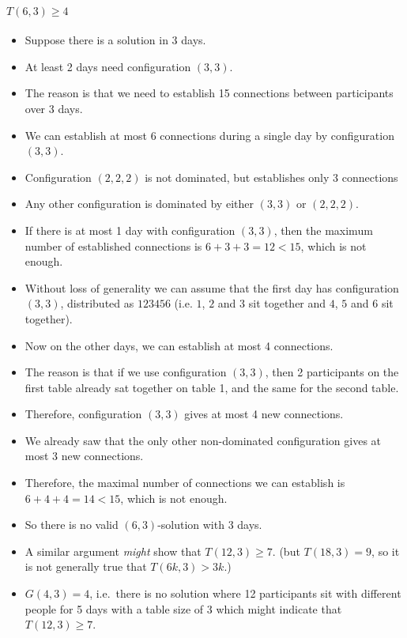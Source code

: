 \documentclass[a4paper]{article}
\begin{document}
\paragraph{$T(6,3) \geq  4$}

\begin{itemize}

\item
  Suppose there is a solution in 3 days.
\item
  At least 2 days need configuration $(3,3)$.
\item
  The reason is that we need to establish 15 connections between
  participants over 3 days.
\item
  We can establish at most 6 connections during a single day by
  configuration $(3,3)$.
\item
  Configuration $(2,2,2)$ is not dominated, but establishes only
  3 connections
\item
  Any other configuration is dominated by either $(3,3)$ or
  $(2,2,2)$.
\item
  If there is at most 1 day with configuration $(3,3)$, then the
  maximum number of established connections is
  $6+3+3=12<15$, which is not enough.
\item
  Without loss of generality we can assume that the first day has
  configuration $(3,3)$, distributed as $123456$ (i.e.
  $1$, $2$ and $3$ sit together and $4$,
  $5$ and $6$ sit together).
\item
  Now on the other days, we can establish at most 4 connections.
\item
  The reason is that if we use configuration $(3,3)$, then 2
  participants on the first table already sat together on table 1, and
  the same for the second table.
\item
  Therefore, configuration $(3,3)$ gives at most 4 new
  connections.
\item
  We already saw that the only other non-dominated configuration gives
  at most 3 new connections.
\item
  Therefore, the maximal number of connections we can establish is
  $6+4+4=14<15$, which is not enough.
\item
  So there is no valid $(6,3)$-solution with 3 days.
\item
  A similar argument \emph{might} show that $T(12,3)\geq 7$. (but
  $T(18,3)=9$, so it is not generally true that
  $T(6k,3)>3k$.)
\item
  $G(4,3)=4$, i.e.~there is no solution where 12 participants
  sit with different people for 5 days with a table size of 3 which
  might indicate that $T(12,3)\geq 7$.
\end{itemize}
\end{document}
